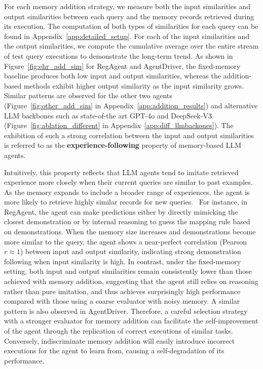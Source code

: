 \documentclass[11pt]{article}
\theoremstyle{plain}
\theoremstyle{definition}
\begin{document}
For each memory addition strategy, we measure both the input similarities and output similarities between each query and the memory records retrieved during its execution.
{The computation of both types of similarities for each query can be found in Appendix~\ref{app:detailed_setup}.}
For each of the input similarities and the output similarities, we compute the cumulative average over the entire stream of test query executions to demonstrate the long-term trend.
As shown in Figure~\ref{fig:ehr_add_sim} for RegAgent and AgentDriver, the fixed-memory baseline produces both low input and output similarities, whereas the addition-based methods exhibit higher output similarity as the input similarity grows.
Similar patterns are observed for the other two agents  (Figure~\ref{fig:other_add_sim} in Appendix~\ref{app:addition_results}) and alternative LLM backbones such as state-of-the art GPT-4o and DeepSeek-V3 (Figure~\ref{fig:ablation_different} in Appendix~\ref{app:diff_llmbackones}).
The exhibition of such a strong correlation between the input and output similarities is referred to as the \textbf{experience-following} property of memory-based LLM agents.

Intuitively, this property reflects that LLM agents tend to imitate retrieved experience more closely when their current queries are similar to past examples.
As the memory expands to include a broader range of experiences, the agent is more likely to retrieve highly similar records for new queries.
{\
For instance, in RegAgent, the agent can make predictions either by directly mimicking the closest demonstration or by internal reasoning to guess the mapping rule based on demonstrations.
When the memory size increases and demonstrations become more similar to the query, the agent shows a near-perfect correlation (Pearson $r \approx 1$) between input and output similarity, indicating strong demonstration following when input similarity is high.
In contrast, under the fixed-memory setting, both input and output similarities remain consistently lower than those achieved with memory addition, suggesting that the agent still relies on reasoning rather than pure imitation, and thus achieves surprisingly high performance compared with those using a coarse evaluator with noisy memory. A similar pattern is also observed in AgentDriver.
} 
Therefore, a careful selection strategy with a stronger evaluator for memory addition can facilitate the self-improvement of the agent through the replication of correct executions of similar tasks.
Conversely, indiscriminate memory addition will easily introduce incorrect executions for the agent to learn from, causing a self-degradation of its performance.
\end{document}
